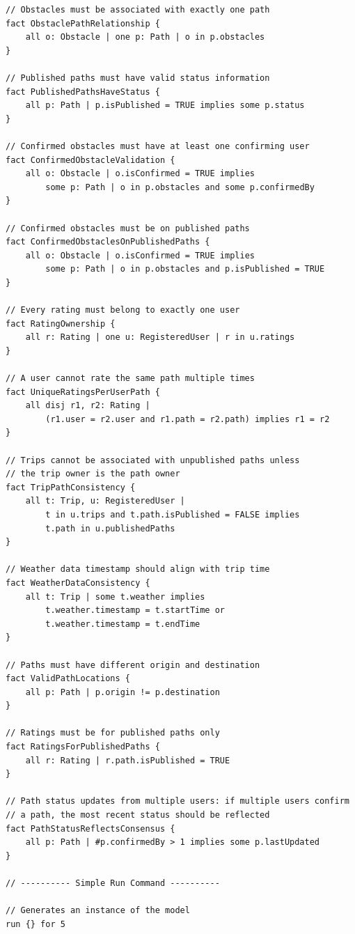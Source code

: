 \begin{lstlisting}
// Obstacles must be associated with exactly one path
fact ObstaclePathRelationship {
    all o: Obstacle | one p: Path | o in p.obstacles
}

// Published paths must have valid status information
fact PublishedPathsHaveStatus {
    all p: Path | p.isPublished = TRUE implies some p.status
}

// Confirmed obstacles must have at least one confirming user
fact ConfirmedObstacleValidation {
    all o: Obstacle | o.isConfirmed = TRUE implies 
        some p: Path | o in p.obstacles and some p.confirmedBy
}

// Confirmed obstacles must be on published paths
fact ConfirmedObstaclesOnPublishedPaths {
    all o: Obstacle | o.isConfirmed = TRUE implies
        some p: Path | o in p.obstacles and p.isPublished = TRUE
}

// Every rating must belong to exactly one user
fact RatingOwnership {
    all r: Rating | one u: RegisteredUser | r in u.ratings
}

// A user cannot rate the same path multiple times
fact UniqueRatingsPerUserPath {
    all disj r1, r2: Rating |
        (r1.user = r2.user and r1.path = r2.path) implies r1 = r2
}

// Trips cannot be associated with unpublished paths unless 
// the trip owner is the path owner
fact TripPathConsistency {
    all t: Trip, u: RegisteredUser | 
        t in u.trips and t.path.isPublished = FALSE implies
        t.path in u.publishedPaths
}

// Weather data timestamp should align with trip time
fact WeatherDataConsistency {
    all t: Trip | some t.weather implies
        t.weather.timestamp = t.startTime or 
        t.weather.timestamp = t.endTime
}

// Paths must have different origin and destination
fact ValidPathLocations {
    all p: Path | p.origin != p.destination
}

// Ratings must be for published paths only
fact RatingsForPublishedPaths {
    all r: Rating | r.path.isPublished = TRUE
}

// Path status updates from multiple users: if multiple users confirm
// a path, the most recent status should be reflected
fact PathStatusReflectsConsensus {
    all p: Path | #p.confirmedBy > 1 implies some p.lastUpdated
}

// ---------- Simple Run Command ----------

// Generates an instance of the model
run {} for 5


\end{lstlisting}
